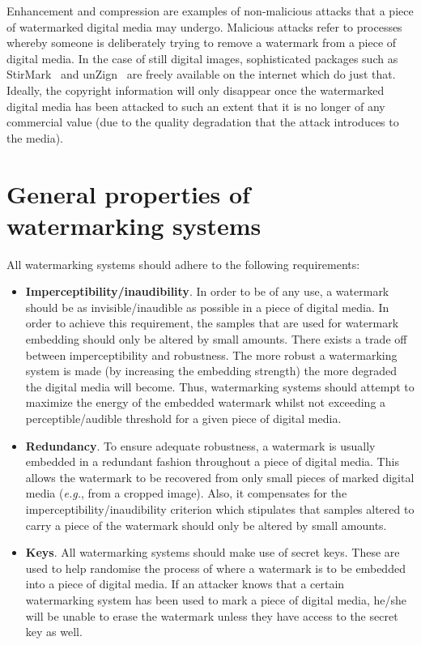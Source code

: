 \documentclass[12pt]{report}
\begin{document}
Enhancement and compression are examples of non-malicious attacks that a piece of watermarked digital media
may undergo. Malicious attacks refer to processes whereby someone is deliberately trying to remove a watermark
from a piece of digital media. In the case of still digital images, 
sophisticated packages such as StirMark~\cite{fab1WI, fab2WI} and unZign~\cite{unzignWIPetit}
are freely available on the internet 
which do just that.
Ideally, the copyright
information will only disappear once the watermarked digital media has been attacked to such an extent that 
it is no longer of any commercial value
(due to the quality degradation that the attack introduces to the media).

\section{General properties of watermarking systems}
All watermarking systems should adhere to the following requirements:
\begin{itemize}
	\item {\bf Imperceptibility/inaudibility}. In order to be of any use, a watermark should be as invisible/inaudible
	as possible in a piece of digital media. In order to achieve this requirement, the samples that are 
	used for watermark embedding should only be altered by small amounts. There exists a trade
	off between imperceptibility and robustness. The more robust a watermarking system is made (by increasing 
	the embedding strength) the more degraded the digital media will become.
	Thus, watermarking systems should attempt to
	maximize the energy of the embedded watermark whilst not exceeding a perceptible/audible threshold for a given
	piece of digital media.
		
	\item {\bf Redundancy}. To ensure adequate robustness, a watermark is usually embedded in a redundant
	fashion throughout a piece of digital media. This allows the watermark to be recovered from only small
	pieces of marked digital media (\emph{e.g.}, from a cropped image). Also, it compensates for the
	imperceptibility/inaudibility criterion which 
	stipulates that samples altered to carry a piece of the watermark 
	should only be altered by small amounts.

	\item {\bf Keys}. All watermarking systems should make use of secret keys. These are used to
	help randomise the process of where a watermark is to be embedded into a piece of digital media.
	If an attacker knows that a certain watermarking system has been used to mark a piece 
	of digital media, he/she will be unable to erase the watermark unless they have access to 
	the secret key as well.

\end{itemize}
\end{document}
